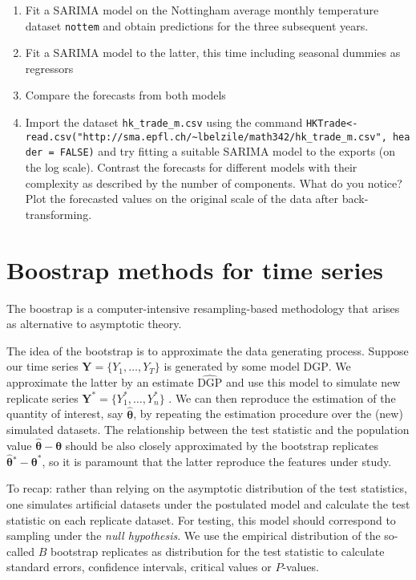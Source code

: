 \documentclass[]{book}
\providecommand{\tightlist}{%
  \setlength{\itemsep}{0pt}\setlength{\parskip}{0pt}}
\begin{document}
\begin{enumerate}
\def\labelenumi{\arabic{enumi}.}
\tightlist
\item
  Fit a SARIMA model on the Nottingham average monthly temperature dataset \texttt{nottem} and obtain predictions for the three subsequent years.
\item
  Fit a SARIMA model to the latter, this time including seasonal dummies as regressors
\item
  Compare the forecasts from both models
\item
  Import the dataset \texttt{hk\_trade\_m.csv} using the command \texttt{HKTrade\textless{}-read.csv("http://sma.epfl.ch/\textasciitilde{}lbelzile/math342/hk\_trade\_m.csv",\ header\ =\ FALSE)} and try fitting a suitable SARIMA model to the exports (on the log scale). Contrast the forecasts for different models with their complexity as described by the number of components. What do you notice? Plot the forecasted values on the original scale of the data after back-transforming.
\end{enumerate}

\hypertarget{boostrap-methods-for-time-series}{%
\section{Boostrap methods for time series}\label{boostrap-methods-for-time-series}}

The boostrap is a computer-intensive resampling-based methodology that arises as alternative to asymptotic theory.

The idea of the bootstrap is to approximate the data generating process. Suppose our time series \(\boldsymbol{Y}=\{Y_1, \ldots, Y_T\}\) is generated by some model \(\mathrm{DGP}\). We approximate the latter by an estimate \(\widehat{\mathrm{DGP}}\) and use this model to simulate new replicate series \(\boldsymbol{Y}^*=\{Y_1^* , \ldots , Y_n^*\}\) . We can then reproduce the estimation of the quantity of interest, say \(\widehat{\boldsymbol{\theta}}\), by repeating the estimation procedure over the (new) simulated datasets. The relationship between the test statistic and the population value \(\widehat{\boldsymbol{\theta}}-\boldsymbol{\theta}\) should be also closely approximated by the bootstrap replicates \(\widehat{\boldsymbol{\theta}}{}^*-\boldsymbol{\theta}^*\), so it is paramount that the latter reproduce the features under study.

To recap: rather than relying on the asymptotic distribution of the test statistics, one simulates artificial datasets under the postulated model and calculate the test statistic on each replicate dataset. For testing, this model should correspond to sampling under the \emph{null hypothesis}. We use the empirical distribution of the so-called \(B\) bootstrap replicates as distribution for the test statistic to calculate standard errors, confidence intervals, critical values or \(P\)-values.
\end{document}
